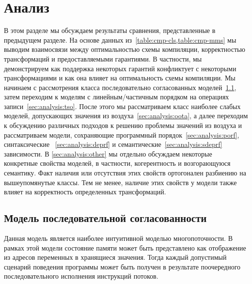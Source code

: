 \section{Анализ}
\label{sec:analysis}


В этом разделе мы обсуждаем результаты сравнения, представленные в предыдущем разделе.
На основе данных из~\cref{table:cmp-cls,table:cmp-mms} 
мы выводим взаимосвязи между оптимальностью схемы компиляции,
корректностью трансформаций и предоставляемыми гарантиями. 
В частности, мы демонстрируем как поддержка 
некоторых гарантий конфликтует с некоторыми трансформациями 
и как она влияет на оптимальность схемы компиляции. 
Мы начинаем с рассмотрения класса 
последовательно согласованных моделей~\cref{sec:analysis:seqcst},
затем  переходим к моделям с линейным/частичным порядком на операциях записи~\cref{sec:analysis:tso}.
После этого мы рассматриваем класс наиболее слабых моделей, 
допускающих значения из воздуха~\cref{sec:analysis:oota}, 
а далее переходим к обсуждению различных подходов 
к решению проблемы значений из воздуха и рассматриваем модели, 
сохраняющие программный порядок~\cref{sec:analysis:porf},
синтаксические ~\cref{sec:analysis:deprf} и
семантические~\cref{sec:analysis:sdeprf} зависимости.
В \cref{sec:analysis:other} мы отдельно обсуждаем некоторые 
конкретные свойства моделей, в частности, когерентность и возгорающуюся семантику. 
Факт наличия или отсутствия этих свойств ортогонален
разбиению на вышеупомянутые классы. 
Тем не менее, наличие этих свойств у модели также влияет 
на корректность определенных трансформаций.

\subsection{Модель последовательной согласованности}
\label{sec:analysis:seqcst}

Данная модель является наиболее интуитивной моделью многопоточности.
В рамках этой модели состояние памяти может быть 
представлено как отображение из 
адресов переменных в хранящиеся значения. 
Тогда каждый допустимый сценарий поведения программы 
может быть получен в результате поочередного последовательного
исполнения инструкций потоков. 

